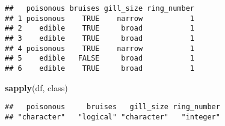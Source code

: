\documentclass[11pt,]{article}
\newenvironment{Shaded}{\begin{snugshade}}{\end{snugshade}}
\newcommand{\KeywordTok}[1]{\textcolor[rgb]{0.13,0.29,0.53}{\textbf{#1}}}
\newcommand{\NormalTok}[1]{#1}
\begin{document}
\begin{verbatim}
##   poisonous bruises gill_size ring_number
## 1 poisonous    TRUE    narrow           1
## 2    edible    TRUE     broad           1
## 3    edible    TRUE     broad           1
## 4 poisonous    TRUE    narrow           1
## 5    edible   FALSE     broad           1
## 6    edible    TRUE     broad           1
\end{verbatim}

\begin{Shaded}
\begin{Highlighting}[]
\KeywordTok{sapply}\NormalTok{(df, class)}
\end{Highlighting}
\end{Shaded}

\begin{verbatim}
##   poisonous     bruises   gill_size ring_number 
## "character"   "logical" "character"   "integer"
\end{verbatim}
\end{document}

